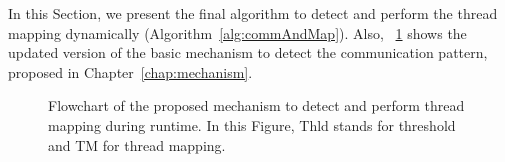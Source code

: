 In this Section, we present the final algorithm to detect and perform the thread mapping dynamically (Algorithm~\ref{alg:commAndMap}). Also, \figurename~\ref{fig:stmap-fluxogram} shows the updated version of the basic mechanism to detect the communication pattern, proposed in Chapter~\ref{chap:mechanism}.

\begin{figure}[!ht]
	\centering
	\caption{Flowchart of the proposed mechanism to detect and perform thread mapping during runtime. In this Figure, Thld stands for threshold and TM for thread mapping.}
	\label{fig:stmap-fluxogram}
\end{figure}

